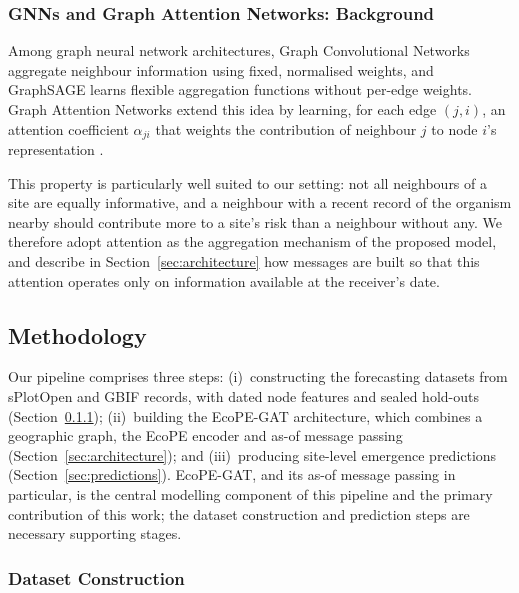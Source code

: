 \documentclass[a4paper,fleqn]{cas-sc}
\begin{document}
\subsubsection{GNNs and Graph Attention Networks: Background}
\label{sec:gat-background}

Among graph neural network architectures, Graph Convolutional Networks aggregate neighbour information using fixed, normalised weights, and GraphSAGE learns flexible aggregation functions without per-edge weights. Graph Attention Networks extend this idea by learning, for each edge $(j,i)$, an attention coefficient $\alpha_{ji}$ that weights the contribution of neighbour $j$ to node $i$'s representation \citep{velickovic2018}.

This property is particularly well suited to our setting: not all neighbours of a site are equally informative, and a neighbour with a recent record of the organism nearby should contribute more to a site's risk than a neighbour without any. We therefore adopt attention as the aggregation mechanism of the proposed model, and describe in Section~\ref{sec:architecture} how messages are built so that this attention operates only on information available at the receiver's date.

\subsection{Methodology}
\label{sec:overview}

Our pipeline comprises three steps: (i)~constructing the forecasting datasets from sPlotOpen and GBIF records, with dated node features and sealed hold-outs (Section~\ref{sec:dataset}); (ii)~building the EcoPE-GAT architecture, which combines a geographic graph, the EcoPE encoder and as-of message passing (Section~\ref{sec:architecture}); and (iii)~producing site-level emergence predictions (Section~\ref{sec:predictions}). EcoPE-GAT, and its as-of message passing in particular, is the central modelling component of this pipeline and the primary contribution of this work; the dataset construction and prediction steps are necessary supporting stages.

\subsubsection{Dataset Construction}
\label{sec:dataset}
\end{document}
